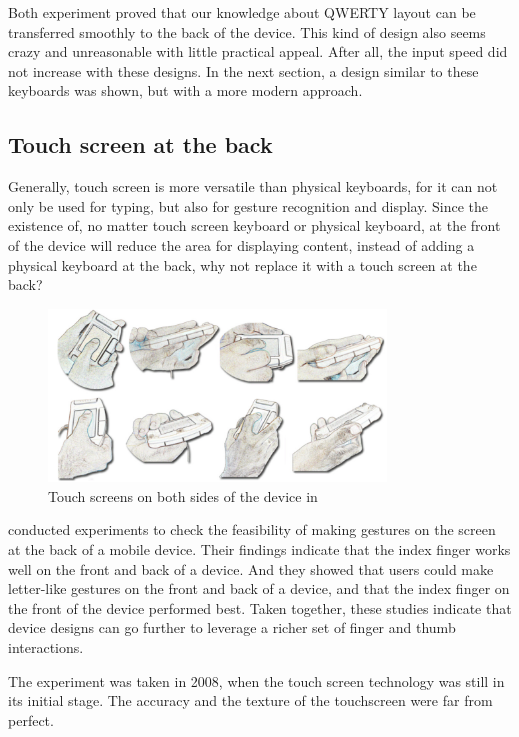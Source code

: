 \documentclass[11pt]{article}
\begin{document}
Both experiment proved that our knowledge about QWERTY layout can be transferred smoothly to the back of the device. This kind of design also seems crazy and unreasonable with little practical appeal. After all, the input speed did not increase with these designs. In the next section, a design similar to these keyboards was shown, but with a more modern approach.

\subsection{Touch screen at the back}
Generally, touch screen is more versatile than physical keyboards, for it can not only be used for typing, but also for gesture recognition and display. Since the existence of, no matter touch screen keyboard or physical keyboard, at the front of the device will reduce the area for displaying content, instead of adding a physical keyboard at the back, why not replace it with a touch screen at the back?

\begin{figure}[H]
  \centering
  \includegraphics[width=0.8\textwidth]{HandPostureFrontBack.png}
  \caption{Touch screens on both sides of the device in \citep{10.1016/j.ijhcs.2008.03.004}}
  \label{fig:handposturefrontback}
\end{figure}

\citet{10.1016/j.ijhcs.2008.03.004} conducted experiments to check the feasibility of making gestures on the screen at the back of a mobile device. Their findings indicate that the index finger works well on the front and back of a device. And they showed that users could make letter-like gestures on the front and back of a device, and that the index finger on the front of the device performed best. Taken together, these studies indicate that device designs can go further to leverage a richer set of finger and thumb interactions. 

The experiment was taken in 2008, when the touch screen technology was still in its initial stage. The accuracy and the texture of the touchscreen were far from perfect.
\end{document}
